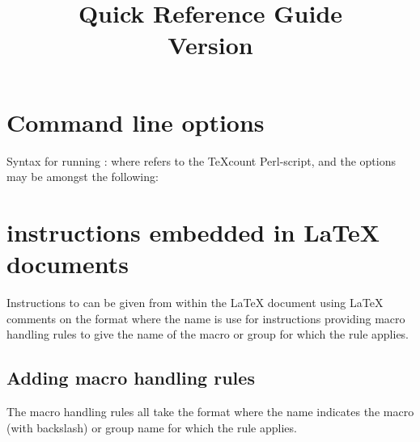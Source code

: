 \documentclass{article}
\title{%
\TeXcount{} Quick Reference Guide\\
Version \version\copyrightfootnote
}
\begin{document}
\maketitle

\section{Command line options}

Syntax for running \TeXcount{}:
where  refers to the TeXcount Perl-script, and the options may be amongst the following:




\section{\TeXcount{} instructions embedded in \LaTeX{} documents}

Instructions to \TeXcount{} can be given from within the
\LaTeX{} document using \LaTeX{} comments on the format
where the name is use for instructions providing macro handling rules to give the name of the macro or group for which the rule applies.



\subsection{Adding macro handling rules}

The macro handling rules all take the format
where the name indicates the macro (with backslash) or group name for which the rule applies.


\end{document}
